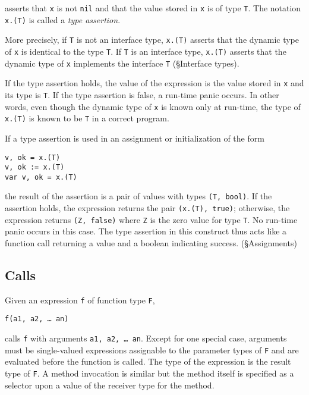 asserts that \texttt{x} is not \texttt{nil} and that the value stored in
\texttt{x} is of type \texttt{T}. The notation \texttt{x.(T)} is called
a \emph{type assertion}.

More precisely, if \texttt{T} is not an interface type, \texttt{x.(T)}
asserts that the dynamic type of \texttt{x} is identical to the
type \texttt{T}. If \texttt{T} is an interface type, \texttt{x.(T)}
asserts that the dynamic type of \texttt{x} implements the interface
\texttt{T} (§Interface types).

If the type assertion holds, the value of the expression is the value
stored in \texttt{x} and its type is \texttt{T}. If the type assertion
is false, a run-time panic occurs. In
other words, even though the dynamic type of \texttt{x} is known only at
run-time, the type of \texttt{x.(T)} is known to be \texttt{T} in a
correct program.

If a type assertion is used in an assignment or initialization of the
form

\begin{Verbatim}[frame=single]
v, ok = x.(T)
v, ok := x.(T)
var v, ok = x.(T)
\end{Verbatim}

the result of the assertion is a pair of values with types \texttt{(T,
bool)}. If the assertion holds, the expression returns the pair
\texttt{(x.(T), true)}; otherwise, the expression returns \texttt{(Z,
false)} where \texttt{Z} is the zero value for type \texttt{T}. No
run-time panic occurs in this case. The type assertion in this
construct thus acts like a function call returning a value and a
boolean indicating success. (§Assignments)

\subsection*{Calls}

Given an expression \texttt{f} of function type \texttt{F},

\begin{Verbatim}[frame=single]
f(a1, a2, … an)
\end{Verbatim}

calls \texttt{f} with arguments \texttt{a1, a2, \ldots{} an}. Except for
one special case, arguments must be single-valued expressions
assignable to the parameter types of
\texttt{F} and are evaluated before the function is called. The type of
the expression is the result type of \texttt{F}. A method invocation is
similar but the method itself is specified as a selector upon a value of
the receiver type for the method.

